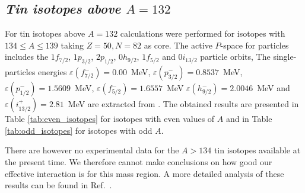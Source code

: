 \documentclass[twoside,12pt]{article}
\begin{document}
\subsection{\it Tin isotopes above $A=132$}

For tin isotopes above $A=132$ calculations were performed for isotopes with $134 \le A \le 139$
taking $Z = 50, N = 82$ as core. The active $P$-space for particles includes the
$1f_{7/2}$, $1p_{3/2}$, $2p_{1/2}$, $0h_{9/2}$, $1f_{5/2}$ and $0i_{13/2}$ particle orbits,
The single-particles energies
$\varepsilon(f_{7/2}^{-}) = 0.00$~MeV,
$\varepsilon(p_{3/2}^{-}) = 0.8537$~MeV,
$\varepsilon(p_{1/2}^{-}) = 1.5609$~MeV,
$\varepsilon(f_{5/2}^{-}) = 1.6557$~MeV
$\varepsilon(h_{9/2}^{-}) = 2.0046$~MeV and
$\varepsilon(i_{13/2}^{+}) =  2.81$~MeV
are extracted from \cite{hoff96}. 
The obtained results are presented in Table \ref{tab:even_isotopes}
for isotopes with even values of $A$ and in Table \ref{tab:odd_isotopes} for isotopes with odd $A$.

There are however no experimental data for the $A > 134$ tin isotopes available at the present time.
We therefore cannot make conclusions on how good our effective interaction is for this mass
region. A more detailed analysis of these results can be found in Ref.~\cite{maximsn134}.
\end{document}
